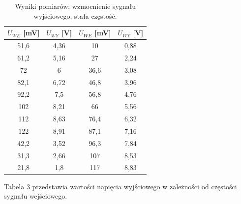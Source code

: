 \documentclass[10pt,a4paper]{article}
\begin{document}
\begin{table}[h!]
\centering
\caption{Wyniki pomiarów: wzmocnienie sygnału wyjściowego; stała częstość.}
\begin{tabular}{|c|c|c|c|}
\hline
$U_{WE}$ [mV] & $U_{WY}$ [V] & $U_{WE}$ [mV] & $U_{WY}$ [V] \\ \hline
51,6          & 4,36         & 10            & 0,88         \\ \hline
61,2          & 5,16         & 27            & 2,24         \\ \hline
72            & 6            & 36,6          & 3,08         \\ \hline
82,1          & 6,72         & 46,8          & 3,96         \\ \hline
92,2          & 7,5          & 56,8          & 4,76         \\ \hline
102           & 8,21         & 66            & 5,56         \\ \hline
112           & 8,63         & 76,4          & 6,32         \\ \hline
122           & 8,91         & 87,1          & 7,16         \\ \hline
42,2          & 3,52         & 96,3          & 7,84         \\ \hline
31,3          & 2,66         & 107           & 8,53         \\ \hline
21,8          & 1,8          & 117           & 8,83         \\ \hline
\end{tabular}
\end{table}

Tabela 3 przedstawia wartości napięcia wyjściowego w zależności od częstości sygnału wejściowego. 
\end{document}
